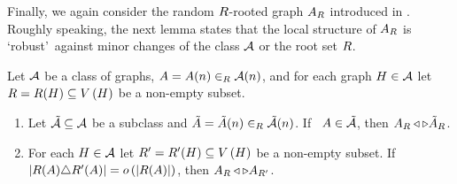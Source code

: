 Finally, we again consider the random $R$-rooted graph $A_{R}$ introduced in . Roughly speaking, the next lemma states that the local structure of $A_{R}$ is \lq robust\rq\ against minor changes of the class $\mathcal{A}$ or the root set $R$.
\begin{lem}\label{LSlem:contiguous2}
Let $\mathcal{A}$ be a class of graphs, $A=A(n)\in_R\mathcal{A}(n)$, and for each graph $H\in\mathcal{A}$ let $R=R(H)\subseteq V\left(H\right)$ be a non-empty subset.
\begin{enumerate}[label=\normalfont(\roman*)]
\item\label{LSlem:contiguous2A}
Let $\tilde{\mathcal{A}}\subseteq\mathcal{A}$ be a subclass and $\tilde{A}=\tilde{A}(n)\in_R\tilde{\mathcal{A}}(n)$. If \whp\ $A\in\tilde{\mathcal{A}}$, then $A_R \triangleleft \triangleright \tilde{A}_R$.
\item\label{LSlem:contiguous2B}
For each $H\in\mathcal{A}$ let $R'=R'(H)\subseteq V\left(H\right)$ be a non-empty subset. If \whp\ $\left|R(A)\triangle R'(A)\right|=o\left(\left|R(A)\right|\right)$, then $A_{R} \triangleleft \triangleright A_{R'}$.
\end{enumerate}
\end{lem}
